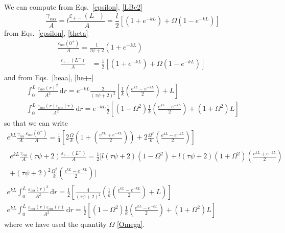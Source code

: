 \documentclass[pre,aps,superscriptaddress,nofootinbib]{revtex4}
\begin{document}
We can compute from Eqs.~\ref{epsilon}, \ref{LBe2}
\begin{equation}
\frac{\gamma_{\alpha\alpha}}{A} = l \frac{\varepsilon_{+-}(L^-)}{A} = \frac{l}{2} \left[(1 + e^{-k L}) + \Omega (1 - e^{-k L})\right]
\end{equation}
from Eqs.~\ref{epsilon}, \ref{theta}
\begin{eqnarray}
\frac{\varepsilon_{\alpha\alpha}(0^+)}{A} = \frac{1}{\tau\psi + 2}(1 + e^{-k L})\\
\begin{aligned}
\frac{\varepsilon_{+-}(L^-)}{A} &= \frac{1}{2} \left[(1 + e^{-k L}) + \Omega (1 - e^{-k L})\right]
\end{aligned}
\end{eqnarray}
and from Eqs.~\ref{heaa}, \ref{he+-}
\begin{eqnarray}
\int_0^L \frac{\varepsilon_{\alpha\alpha}(r)^2}{A^2} \, \mathrm{d}r = e^{-k L} \frac{2}{(\tau \psi + 2)^2} \left[\frac{1}{k} \left(\frac{e^{k L} - e^{- k L}}{2}\right) + L\right]\\
\int_0^L \frac{\varepsilon_{\alpha\overline{\alpha}}(r)\varepsilon_{\overline{\alpha}\alpha}(r)}{A^2} \, \mathrm{d}r = e^{-k L} \frac{1}{2} \left[(1 - \Omega^2) \frac{1}{k} \left(\frac{e^{k L} - e^{-k L}}{2}\right) + (1 + \Omega^2) L\right]
\end{eqnarray}
so that we can write
\begin{eqnarray}
\label{gaa-full}
e^{k L} \frac{\gamma_{\alpha\alpha}}{A} \frac{\varepsilon_{\alpha\alpha}(0^+)}{A} = \frac{1}{4} \left[2 \frac{\Omega}{k} \left(1 + \left(\frac{e^{k L} + e^{-k L}}{2}\right)\right) + 2 \frac{\Omega^2}{k} \left(\frac{e^{k L} - e^{-k L}}{2}\right)\right]\\
\label{gaba-full}
\begin{aligned}
e^{k L} \frac{\gamma_{\alpha\alpha}}{A} (\tau \psi + 2) \frac{\varepsilon_{+-}(L^-)}{A} = \frac{1}{2} \Bigg[l(\tau \psi + 2)(1 - \Omega^2) + l(\tau\psi + 2)(1 + \Omega^2)\left(\frac{e^{k L} + e^{-k L}}{2}\right)\\
+ (\tau \psi + 2)^2 \frac{\Omega^2}{k} \left(\frac{e^{k L} - e^{-k L}}{2}\right)\Bigg]
\end{aligned}\\
e^{k L} \int_0^L \frac{\varepsilon_{\alpha\alpha}(r)^2}{A^2} \, \mathrm{d}r = \frac{1}{2} \left[\frac{4}{(\tau\psi + 2)^2} \left(\frac{1}{k}\left(\frac{e^{k L} - e^{- k L}}{2}\right) + L\right)\right]\\
e^{k L} \int_0^L \frac{\varepsilon_{\alpha\overline{\alpha}}(r)\varepsilon_{\overline{\alpha}\alpha}(r)}{A^2} \, \mathrm{d}r = \frac{1}{2} \left[(1 - \Omega^2) \frac{1}{k}\left(\frac{e^{k L} - e^{-k L}}{2}\right) + (1 + \Omega^2) L\right]
\end{eqnarray}
where we have used the quantity $\Omega$ \eqref{Omega}.\\
\end{document}
